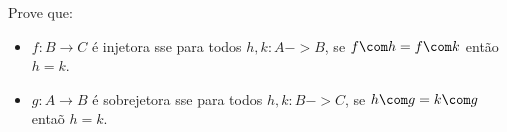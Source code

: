 \begin{exercise}
Prove que:
\begin{itemize}
    \item $f : B \to C$ é injetora sse para todos $h,k : A -> B$, se $f \com h = f \com k$ então $h = k$.
    \item $g : A \to B$ é sobrejetora sse para todos $h,k : B -> C$, se $h \com g = k \com g$ entaõ $h = k$.
\end{itemize}
\end{exercise}
